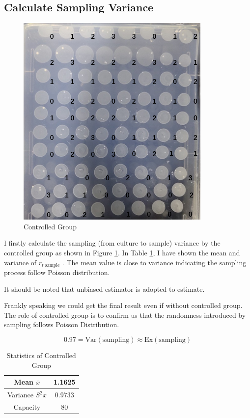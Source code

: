\documentclass[UTF-8]{article}
\begin{document}
\subsection{Calculate Sampling Variance}
\begin{figure}[h]
    \centering
    \includegraphics[width=0.5\linewidth]{../Figures/controlled group.png}
    \caption{Controlled Group}
    \label{controlled group}
\end{figure}
I firstly calculate the sampling (from culture to sample) variance by the controlled group as shown in Figure \ref{controlled group}.
In Table \ref{Statistics of Controlled Group}, I have shown the mean and variance of $r_{t \text{ sample}}$ .
The mean value is close to variance indicating the sampling process follow Poisson distribution.

It should be noted that unbiased estimator is adopted to estimate.

Frankly speaking we could get the final result even if without controlled group.
The role of controlled group is to confirm us that the randomness introduced by sampling follows Poisson Distribution.

$$
0.97=\text{Var}(\text{sampling})\approx\text{Ex}(\text{sampling})
$$

\begin{table}[h]
    \centering
    \begin{tabular}{|c|c|}\hline
        Mean $\bar {x}$ & 1.1625 \\ \hline
        Variance $S^2x$ & 0.9733\\ \hline
        Capacity & 80\\ \hline
    \end{tabular}
    \caption{Statistics of Controlled Group}
    \label{Statistics of Controlled Group}
\end{table}
\end{document}
